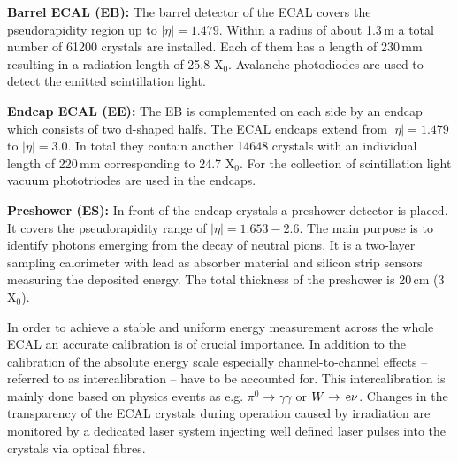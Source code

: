 \begin{description}
 \item \textbf{Barrel ECAL (EB):} The barrel detector of the ECAL covers the pseudorapidity region up to $|\eta| = 1.479$. Within a radius of about 1.3\,m a total number of 61200 crystals are installed. Each of them has a length of 230\,mm resulting in a radiation length of 25.8 $\mathrm{X_0}$. Avalanche photodiodes are used to detect the emitted scintillation light.
 \item \textbf{Endcap ECAL (EE):} The EB is complemented on each side by an endcap which consists of two d-shaped halfs. The ECAL endcaps extend from $|\eta| = 1.479$ to $|\eta| = 3.0$. In total they contain another 14648 crystals with an individual length of 220\,mm corresponding to 24.7 $\mathrm{X}_0$. For the collection of scintillation light vacuum phototriodes are used in the endcaps.
 \item \textbf{Preshower (ES):} In front of the endcap crystals a preshower detector is placed. It covers the pseudorapidity range of $|\eta| = 1.653 - 2.6$. The main purpose is to identify photons emerging from the decay of neutral pions. It is a two-layer sampling calorimeter with lead as absorber material and silicon strip sensors measuring the deposited energy. The total thickness of the preshower is 20\,cm (3 $\mathrm{X_0}$).
\end{description}
In order to achieve a stable and uniform energy measurement across the whole ECAL an accurate calibration is of crucial importance. In addition to the calibration of the absolute energy scale especially channel-to-channel effects -- referred to as intercalibration -- have to be accounted for. This intercalibration is mainly done based on physics events as e.g. $\pi^0 \rightarrow \gamma \gamma$ or $W \rightarrow \,\text{e} \nu$. Changes in the transparency of the ECAL crystals during operation caused by irradiation are monitored by a dedicated laser system injecting well defined laser pulses into the crystals via optical fibres. 

